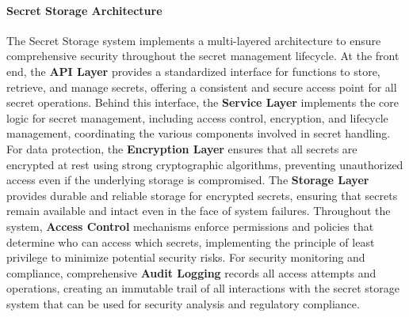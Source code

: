 \documentclass[11pt]{article}
\begin{document}
\paragraph{Secret Storage Architecture}
The Secret Storage system implements a multi-layered architecture to ensure comprehensive security throughout the secret management lifecycle. At the front end, the \textbf{API Layer} provides a standardized interface for functions to store, retrieve, and manage secrets, offering a consistent and secure access point for all secret operations. Behind this interface, the \textbf{Service Layer} implements the core logic for secret management, including access control, encryption, and lifecycle management, coordinating the various components involved in secret handling. For data protection, the \textbf{Encryption Layer} ensures that all secrets are encrypted at rest using strong cryptographic algorithms, preventing unauthorized access even if the underlying storage is compromised. The \textbf{Storage Layer} provides durable and reliable storage for encrypted secrets, ensuring that secrets remain available and intact even in the face of system failures. Throughout the system, \textbf{Access Control} mechanisms enforce permissions and policies that determine who can access which secrets, implementing the principle of least privilege to minimize potential security risks. For security monitoring and compliance, comprehensive \textbf{Audit Logging} records all access attempts and operations, creating an immutable trail of all interactions with the secret storage system that can be used for security analysis and regulatory compliance.
\end{document}
